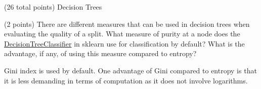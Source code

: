 \documentclass[12pt]{article}
\begin{document}
\begin{question}{(26 total points) Decision Trees}
\begin{subquestion}



\end{subquestion}


%
%
\begin{subquestion}{(2 points) 
There are different measures that can be used in decision trees when evaluating the quality of a split. 
What measure of purity at a node does the \href{https://scikit-learn.org/0.19/modules/generated/sklearn.tree.DecisionTreeClassifier.html}{DecisionTreeClassifier} in sklearn use for classification by default? 
What is the advantage, if any, of using this measure compared to entropy? 
}


\begin{answerbox}{10em}
Gini index is used by default. One advantage of Gini compared to entropy is that it is 
less demanding in terms of computation as it does not involve logarithms.
\end{answerbox}



\end{subquestion}



\end{question}
\end{document}
